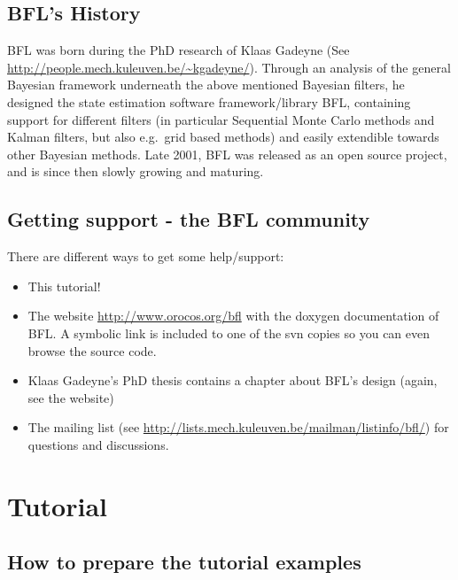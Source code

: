 \documentclass[a4paper,10pt]{report}
\begin{document}
\section{BFL's History}
BFL was born during the PhD research of Klaas Gadeyne (See
\url{http://people.mech.kuleuven.be/~kgadeyne/}).  Through an analysis
of the general Bayesian framework underneath the above mentioned
Bayesian filters, he designed the state estimation software
framework/library BFL, containing support for different filters (in
particular Sequential Monte Carlo methods and Kalman filters, but also
e.g.~grid based methods) and easily extendible towards other Bayesian
methods. Late 2001, BFL was released as an open source project, and is
since then slowly growing and maturing.

\section{Getting support - the BFL community}
There are different ways to get some help/support:
\begin{itemize}
\item This tutorial!
\item The website
  \url{http://www.orocos.org/bfl} with the
  doxygen documentation of BFL. A symbolic link is included to one of
  the svn copies so you can even browse the source code.
\item Klaas Gadeyne's PhD thesis contains a chapter about BFL's design
  (again, see the website)
\item The mailing list (see
  \url{http://lists.mech.kuleuven.be/mailman/listinfo/bfl/}) for
  questions and discussions.
\end{itemize}







\chapter{Tutorial}
\label{chapt:tutorial}
\section{How to prepare the tutorial examples}
\end{document}
